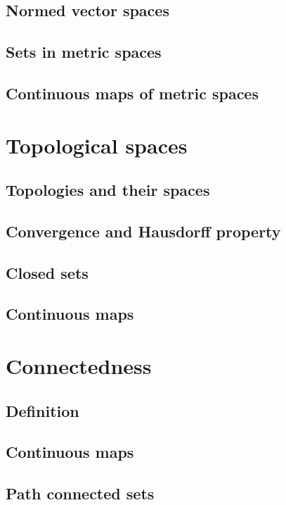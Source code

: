 \documentclass[../Year2.tex]{subfiles}
\begin{document}
\subsection{Normed vector spaces}

\subsection{Sets in metric spaces}

\subsection{Continuous maps of metric spaces}

\section{Topological spaces}

\subsection{Topologies and their spaces}

\subsection{Convergence and Hausdorff property}

\subsection{Closed sets}

\subsection{Continuous maps}

\section{Connectedness}

\subsection{Definition}

\subsection{Continuous maps}

\subsection{Path connected sets}
\end{document}
